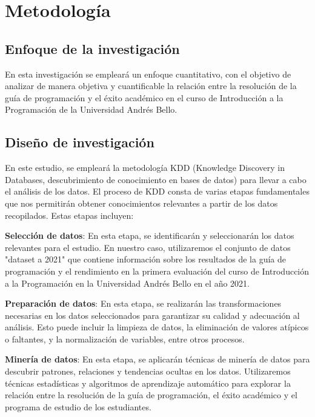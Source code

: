 \hypertarget{metodología}{%
  \section{Metodología}\label{Metodología}}

\subsection{Enfoque de la investigación}

En esta investigación se empleará un enfoque cuantitativo, con el objetivo de analizar de manera objetiva y cuantificable
la relación entre la resolución de la guía de programación y el éxito académico en el curso de Introducción a la
Programación de la Universidad Andrés Bello.

\subsection{Diseño de investigación}

En este estudio, se empleará la metodología KDD (Knowledge Discovery in Databases, descubrimiento de conocimiento en bases de datos) para llevar a cabo el análisis de los datos. El proceso de KDD consta de varias etapas fundamentales que nos permitirán obtener conocimientos relevantes a partir de los datos recopilados. Estas etapas incluyen:

\textbf{Selección de datos}: En esta etapa, se identificarán y seleccionarán los datos relevantes para el estudio. En nuestro caso, utilizaremos el conjunto de datos "dataset a 2021" que contiene información sobre los resultados de la guía de programación y el rendimiento en la primera evaluación del curso de Introducción a la Programación en la Universidad Andrés Bello en el año 2021.

\textbf{Preparación de datos}: En esta etapa, se realizarán las transformaciones necesarias en los datos seleccionados para garantizar su calidad y adecuación al análisis. Esto puede incluir la limpieza de datos, la eliminación de valores atípicos o faltantes, y la normalización de variables, entre otros procesos.

\textbf{Minería de datos}: En esta etapa, se aplicarán técnicas de minería de datos para descubrir patrones, relaciones y tendencias ocultas en los datos. Utilizaremos técnicas estadísticas y algoritmos de aprendizaje automático para explorar la relación entre la resolución de la guía de programación, el éxito académico y el programa de estudio de los estudiantes.

